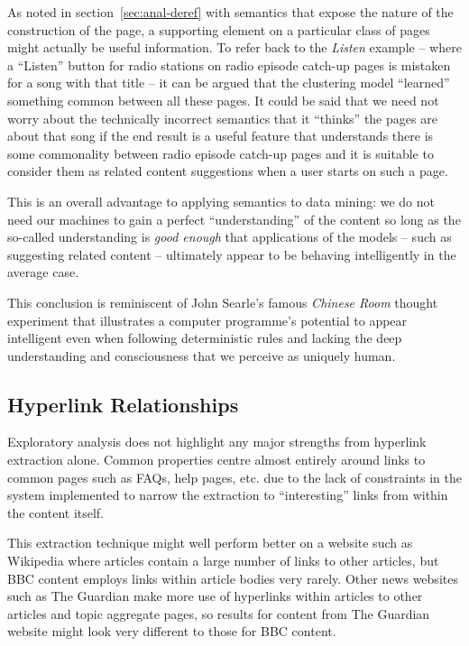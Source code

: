 As noted in section~\ref{sec:anal-deref} with semantics that expose
the nature of the construction of the page, a supporting element on
a particular class of pages might actually be useful information. To
refer back to the \emph{Listen} example -- where a ``Listen'' button
for radio stations on radio episode catch-up pages is mistaken for
a song with that title -- it can be argued that the clustering model
``learned'' something common between all these pages. It could be
said that we need
not worry about the technically incorrect semantics that it ``thinks''
the pages are about that song if the end result is a useful feature
that understands there is some commonality between radio episode
catch-up pages and it is suitable to consider them as related content
suggestions when a user starts on such a page.

This is an overall advantage to applying semantics to data mining:
we do not need our machines to gain a perfect ``understanding'' of
the content so long as the so-called understanding is
\emph{good enough} that applications of the models -- such as
suggesting related content -- ultimately appear to be behaving
intelligently in the average case.

This conclusion is reminiscent of John Searle's famous
\emph{Chinese Room} thought experiment\cite{searle1980minds}
that illustrates a computer
programme's potential to appear intelligent even when following
deterministic rules and lacking the deep understanding and
consciousness that we perceive as uniquely human.

\subsection{Hyperlink Relationships}
\label{sec:anal-hyperlink}

Exploratory analysis does not highlight any major strengths from
hyperlink extraction alone. Common properties centre almost entirely
around links to common pages such as FAQs, help pages, etc. due to the
lack of constraints in the system implemented to narrow the extraction
to ``interesting'' links from within the content itself.

This extraction technique might well perform better on a website
such as Wikipedia where articles contain a large number of links to
other articles, but BBC content employs links within article bodies
very rarely. Other news websites such as The Guardian make more
use of hyperlinks within articles to other articles and topic
aggregate pages, so results for content from The Guardian website
might look very different to those for BBC content.

